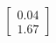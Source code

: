 \documentclass[preview]{standalone}
\begin{document}
\begin{align*}
\begin{bmatrix} 0.04 \\ 1.67 \end{bmatrix}
\end{align*}
\end{document}
